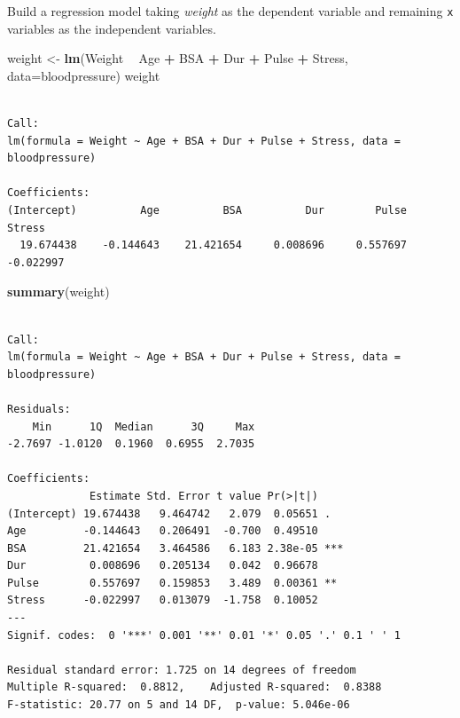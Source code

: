 \documentclass[]{article}
\newenvironment{Shaded}{\begin{snugshade}}{\end{snugshade}}
\newcommand{\DataTypeTok}[1]{\textcolor[rgb]{0.13,0.29,0.53}{#1}}
\newcommand{\KeywordTok}[1]{\textcolor[rgb]{0.13,0.29,0.53}{\textbf{#1}}}
\newcommand{\NormalTok}[1]{#1}
\newcommand{\OperatorTok}[1]{\textcolor[rgb]{0.81,0.36,0.00}{\textbf{#1}}}
\newcommand{\StringTok}[1]{\textcolor[rgb]{0.31,0.60,0.02}{#1}}
\begin{document}
Build a regression model taking \emph{weight} as the dependent variable
and remaining \texttt{x} variables as the independent variables.

\begin{Shaded}
\begin{Highlighting}[]
\NormalTok{weight <-}\StringTok{ }\KeywordTok{lm}\NormalTok{(Weight }\OperatorTok{~}\StringTok{ }\NormalTok{Age  }\OperatorTok{+}\StringTok{ }\NormalTok{BSA }\OperatorTok{+}\StringTok{ }\NormalTok{Dur }\OperatorTok{+}\StringTok{ }\NormalTok{Pulse }\OperatorTok{+}\StringTok{ }\NormalTok{Stress, }\DataTypeTok{data=}\NormalTok{bloodpressure)}
\NormalTok{weight}
\end{Highlighting}
\end{Shaded}

\begin{verbatim}

Call:
lm(formula = Weight ~ Age + BSA + Dur + Pulse + Stress, data = bloodpressure)

Coefficients:
(Intercept)          Age          BSA          Dur        Pulse       Stress  
  19.674438    -0.144643    21.421654     0.008696     0.557697    -0.022997  
\end{verbatim}

\begin{Shaded}
\begin{Highlighting}[]
\KeywordTok{summary}\NormalTok{(weight)}
\end{Highlighting}
\end{Shaded}

\begin{verbatim}

Call:
lm(formula = Weight ~ Age + BSA + Dur + Pulse + Stress, data = bloodpressure)

Residuals:
    Min      1Q  Median      3Q     Max 
-2.7697 -1.0120  0.1960  0.6955  2.7035 

Coefficients:
             Estimate Std. Error t value Pr(>|t|)    
(Intercept) 19.674438   9.464742   2.079  0.05651 .  
Age         -0.144643   0.206491  -0.700  0.49510    
BSA         21.421654   3.464586   6.183 2.38e-05 ***
Dur          0.008696   0.205134   0.042  0.96678    
Pulse        0.557697   0.159853   3.489  0.00361 ** 
Stress      -0.022997   0.013079  -1.758  0.10052    
---
Signif. codes:  0 '***' 0.001 '**' 0.01 '*' 0.05 '.' 0.1 ' ' 1

Residual standard error: 1.725 on 14 degrees of freedom
Multiple R-squared:  0.8812,    Adjusted R-squared:  0.8388 
F-statistic: 20.77 on 5 and 14 DF,  p-value: 5.046e-06
\end{verbatim}
\end{document}
